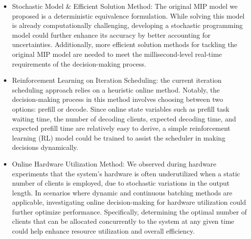 \begin{itemize}
    \item Stochastic Model \& Efficient Solution Method: The original MIP model we proposed is a deterministic equivalence formulation. While solving this model is already computationally challenging, developing a stochastic programming model could further enhance its accuracy by better accounting for uncertainties. Additionally, more efficient solution methods for tackling the original MIP model are needed to meet the millisecond-level real-time requirements of the decision-making process.
    \item Reinforcement Learning on Iteration Scheduling: the current iteration scheduling approach relies on a heuristic online method. Notably, the decision-making process in this method involves choosing between two options: prefill or decode. Since online state variables such as prefill task waiting time, the number of decoding clients, expected decoding time, and expected prefill time are relatively easy to derive, a simple reinforcement learning (RL) model could be trained to assist the scheduler in making decisions dynamically. 
    \item Online Hardware Utilization Method: We observed during hardware experiments that the system's hardware is often underutilized when a static number of clients is employed, due to stochastic variations in the output length. In scenarios where dynamic and continuous batching methods are applicable, investigating online decision-making for hardware utilization could further optimize performance. Specifically, determining the optimal number of clients that can be allocated concurrently to the system at any given time could help enhance resource utilization and overall efficiency.
\end{itemize}

